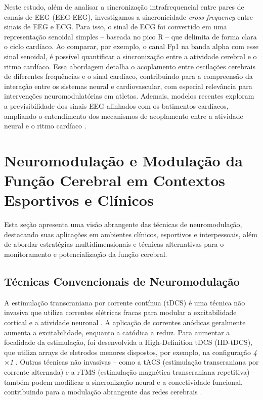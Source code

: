 Neste estudo, além de analisar a sincronização intrafrequencial entre pares de canais de EEG (EEG-EEG), investigamos a sincronicidade \textit{cross-frequency} entre sinais de EEG e ECG. Para isso, o sinal de ECG foi convertido em uma representação senoidal simples – baseada no pico R – que delimita de forma clara o ciclo cardíaco. Ao comparar, por exemplo, o canal Fp1 na banda alpha com esse sinal senoidal, é possível quantificar a sincronização entre a atividade cerebral e o ritmo cardíaco. Essa abordagem detalha o acoplamento entre oscilações cerebrais de diferentes frequências e o sinal cardíaco, contribuindo para a compreensão da interação entre os sistemas neural e cardiovascular, com especial relevância para intervenções neuromodulatórias em atletas. Ademais, modelos recentes exploram a previsibilidade dos sinais EEG alinhados com os batimentos cardíacos, ampliando o entendimento dos mecanismos de acoplamento entre a atividade neural e o ritmo cardíaco \cite{vergara2024exploring}.

\section{Neuromodulação e Modulação da Função Cerebral em Contextos Esportivos e Clínicos}

Esta seção apresenta uma visão abrangente das técnicas de neuromodulação, destacando suas aplicações em ambientes clínicos, esportivos e interpessoais, além de abordar estratégias multidimensionais e técnicas alternativas para o monitoramento e potencialização da função cerebral.

\subsection{Técnicas Convencionais de Neuromodulação}
A estimulação transcraniana por corrente contínua (tDCS) é uma técnica não invasiva que utiliza correntes elétricas fracas para modular a excitabilidade cortical e a atividade neuronal \cite{nitsche2000excitability, okano2013estimulacao, stagg2011physiological, purpura1965intracellular}. A aplicação de correntes anódicas geralmente aumenta a excitabilidade, enquanto a catódica a reduz. Para aumentar a focalidade da estimulação, foi desenvolvida a High-Definition tDCS (HD-tDCS), que utiliza arrays de eletrodos menores dispostos, por exemplo, na configuração \emph{4$\times$1} \cite{villamar2013hdtdcs}. Outras técnicas não invasivas – como a tACS (estimulação transcraniana por corrente alternada) e a rTMS (estimulação magnética transcraniana repetitiva) – também podem modificar a sincronização neural e a conectividade funcional, contribuindo para a modulação abrangente das redes cerebrais \cite{scheler2019neuromodulation, kunze2014high}.

